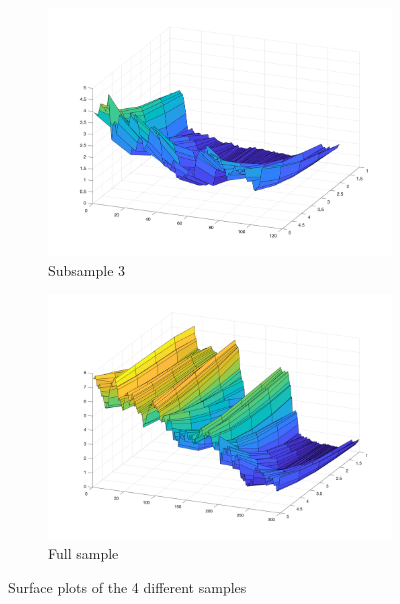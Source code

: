 \begin{figure}
\begin{subfigure}[b]{0.45\textwidth}
         \includegraphics[width=\textwidth]{figures/sample3}
         \caption{Subsample 3}
         \label{fig:subsample3}
     \end{subfigure}
     \begin{subfigure}[b]{0.45\textwidth}
         \centering
         \includegraphics[width=\textwidth]{figures/fullsample}
         \caption{Full sample}
         \label{fig:fullsample}
     \end{subfigure}
     \caption{Surface plots of the 4 different samples}
     \label{fig:samples}
\end{figure}